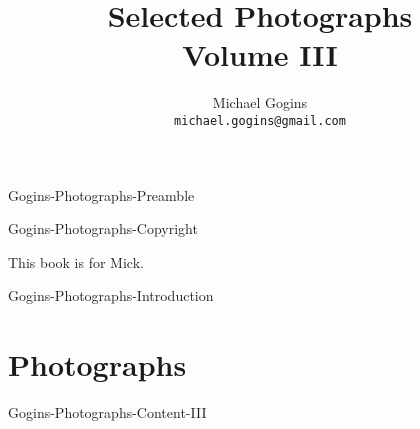  {Gogins-Photographs-Preamble}

	\frontmatter
	\onecolumn
	
	\title{Selected Photographs \\ Volume III}
	\author{Michael Gogins \\ \texttt{michael.gogins@gmail.com}}
	
	\maketitle
	
	 {Gogins-Photographs-Copyright}
	
	\clearpage
	\begin{centering}
		This book is for Mick.
	\end{centering}
	
	\tableofcontents
	\listoffigures
	
	\mainmatter
	
	\pagestyle{headings}
	\twocolumn
	
	 {Gogins-Photographs-Introduction}	
	
	\chapter{Photographs}
	
	 {Gogins-Photographs-Content-III}


